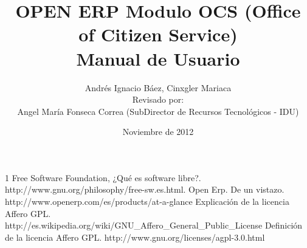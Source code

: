 \documentclass[letterpaper,12pt]{article}
\title{OPEN ERP Modulo OCS (Office of Citizen Service)\\Manual de Usuario}
\author{Andrés Ignacio Báez, Cinxgler Mariaca\\Revisado por: \\
Angel María Fonseca Correa (SubDirector de Recursos Tecnológicos - IDU)}
\date{Noviembre de 2012}
\begin{document}
\maketitle
%








\begin {thebibliography}{1} 
 Free Software Foundation, ¿Qué es software libre?. http://www.gnu.org/philosophy/free-sw.es.html.
 Open Erp. De un vistazo. http://www.openerp.com/es/products/at-a-glance
 Explicación de la licencia Affero GPL. \\http://es.wikipedia.org/wiki/GNU\_Affero\_General\_Public\_License 
 Definición de la licencia Affero GPL. http://www.gnu.org/licenses/agpl-3.0.html
\end {thebibliography}
\end{document}
